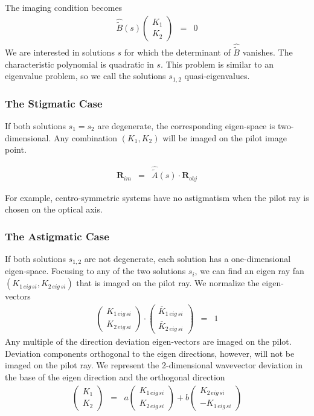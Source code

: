 \documentclass[12pt,a4paper,twoside,openright,BCOR10mm,headsepline,titlepage,abstracton,chapterprefix,final]{scrreprt}
\newcommand\Vector[1]{{\mathbf{#1}}}
\begin{document}
The imaging condition becomes
\begin{eqnarray}
 \hat{\tilde{B}}(s) \begin{pmatrix} K_1 \\ K_2 \end{pmatrix} &=& 0
\end{eqnarray}
We are interested in solutions $s$ for which the determinant of $\hat{\tilde{B}}$ vanishes.
The characteristic polynomial is quadratic in $s$.
This problem is similar to an eigenvalue problem, so we call the solutions $s_{1,2}$ quasi-eigenvalues.

\subsubsection{The Stigmatic Case}
If both solutions $s_1 = s_2$ are degenerate, the corresponding eigen-space is two-dimensional.
Any combination $(K_1, K_2)$ will be imaged on the pilot image point.

\begin{eqnarray}
 \Vector{R}_{im} &=& \hat{\tilde{A}}(s) \cdot \Vector{R}_{obj}
\end{eqnarray}

For example, centro-symmetric systems have no astigmatism when the pilot ray is chosen on the optical axis.

\subsubsection{The Astigmatic Case}
If both solutions $s_{1,2}$ are not degenerate, each solution has a one-dimensional eigen-space.
Focusing to any of the two solutions $s_i$, 
we can find an eigen ray fan $(K_{1\,eig\,si},K_{2\,eig\,si})$ that is imaged on the pilot ray.
We normalize the eigen-vectors
\begin{eqnarray}
 \begin{pmatrix} K_{1\,eig\,si} \\   K_{2\,eig\,si} \end{pmatrix} \cdot  \begin{pmatrix} \overline{K}_{1\,eig\,si} \\ \overline{K}_{2\,eig\,si} \end{pmatrix}
 &=& 1
\end{eqnarray}
Any multiple of the direction deviation eigen-vectors are imaged on the pilot.
Deviation components orthogonal to the eigen directions, however, will not be imaged on the pilot ray.
We represent the 2-dimensional wavevector deviation in the base of the eigen direction and the orthogonal direction
\begin{eqnarray}
     \begin{pmatrix} K_1            \\   K_2            \end{pmatrix} &=& 
   a \begin{pmatrix} K_{1\,eig\,si} \\   K_{2\,eig\,si} \end{pmatrix} 
 + b \begin{pmatrix} K_{2\,eig\,si} \\ - K_{1\,eig\,si} \end{pmatrix}
\end{eqnarray}
\end{document}
